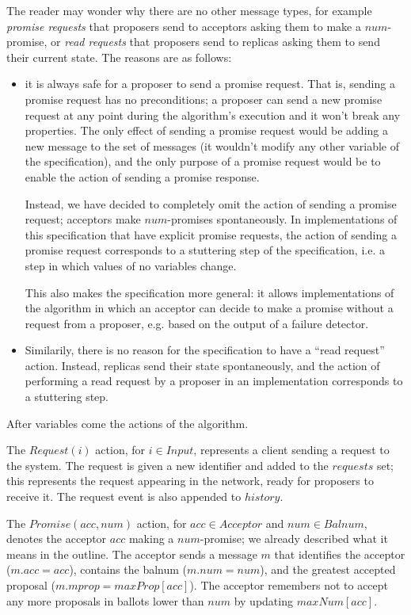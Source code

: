 \documentclass[12pt,a4paper,en]{pracamgr}
\newcommand{\ti}[1]{\textit{#1}}
\begin{document}
The reader may wonder why there are no other message types, for example \ti{promise requests} that proposers send to acceptors asking them to make a $num$-promise, or \ti{read requests} that proposers send to replicas asking them to send their current state. The reasons are as follows:
\begin{itemize}
    \item it is always safe for a proposer to send a promise request. That is, sending a promise request has no preconditions; a proposer can send a new promise request at any point during the algorithm's execution and it won't break any properties. The only effect of sending a promise request would be adding a new message to the set of messages (it wouldn't modify any other variable of the specification), and the only purpose of a promise request would be to enable the action of sending a promise response.

        Instead, we have decided to completely omit the action of sending a promise request; acceptors make $num$-promises spontaneously. In implementations of this specification that have explicit promise requests, the action of sending a promise request corresponds to a stuttering step of the specification, i.e. a step in which values of no variables change.

        This also makes the specification more general: it allows implementations of the algorithm in which an acceptor can decide to make a promise without a request from a proposer, e.g. based on the output of a failure detector.

    \item Similarily, there is no reason for the specification to have a ``read request'' action. Instead, replicas send their state spontaneously, and the action of performing a read request by a proposer in an implementation corresponds to a stuttering step.
\end{itemize}

After variables come the actions of the algorithm.

The $Request(i)$ action, for $i \in Input$, represents a client sending a request to the system. The request is given a new identifier and added to the $requests$ set; this represents the request appearing in the network, ready for proposers to receive it. The request event is also appended to $history$.

The $Promise(acc, num)$ action, for $acc \in Acceptor$ and $num \in Balnum$, denotes the acceptor $acc$ making a $num$-promise; we already described what it means in the outline. The acceptor sends a message $m$ that identifies the acceptor ($m.acc = acc$), contains the balnum ($m.num = num$), and the greatest accepted proposal ($m.mprop = maxProp[acc]$). The acceptor remembers not to accept any more proposals in ballots lower than $num$ by updating $maxNum[acc]$.
\end{document}
